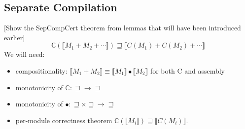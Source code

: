 
\subsection{Separate Compilation} %

[Show the SepCompCert theorem
from lemmas that will have been introduced earlier]
\[
  \mathbb{C}(\llbracket M_1 + M_2 + \cdots \rrbracket) \sqsupseteq
  \llbracket C(M_1) + C(M_2) + \cdots \rrbracket
\]
We will need:
\begin{itemize}
\item compositionality:
  $\llbracket M_1 + M_2 \rrbracket \equiv
   \llbracket M_1 \rrbracket \bullet \llbracket M_2 \rrbracket$
  for both C and assembly
\item monotonicity of $\mathbb{C} : {\sqsupseteq} \rightarrow {\sqsupseteq}$
\item monotonicity of $\bullet : {\sqsupseteq} \times {\sqsupseteq} \rightarrow {\sqsupseteq}$
\item per-module correctness theorem $\mathbb{C}(\llbracket M_i \rrbracket) \sqsupseteq \llbracket C(M_i) \rrbracket$.
\end{itemize}


